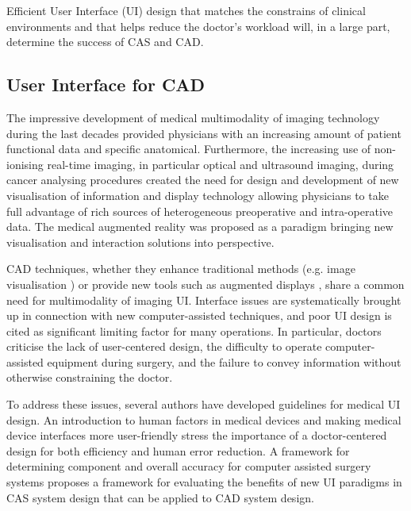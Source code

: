 Efficient User Interface (UI) design that matches the constrains of clinical environments and that helps reduce the doctor's workload will, in a large part, determine the success of CAS and CAD.

\subsection{User Interface for CAD}

The impressive development of medical multimodality of imaging technology during the last decades provided physicians with an increasing amount of patient functional data and specific anatomical. Furthermore, the increasing use of non-ionising real-time imaging, in particular optical and ultrasound imaging, during cancer analysing procedures created the need for design and development of new visualisation of information and display technology \cite{sielhorst2008advanced} allowing physicians to take full advantage of rich sources of heterogeneous preoperative and intra-operative data. The medical augmented reality was proposed as a paradigm bringing new visualisation and interaction solutions into perspective.

\clearpage

CAD techniques, whether they enhance traditional methods (e.g. image visualisation \cite{vogt2003system}) or provide new tools such as augmented displays \cite{sielhorst2008advanced}, share a common need for multimodality of imaging \gls{UI}. Interface issues are systematically brought up in connection with new computer-assisted techniques, and poor UI design is cited \cite{grange2004m, vogt2003system} as significant limiting factor for many operations. In particular, doctors criticise the lack of user-centered design, the difficulty to operate computer-assisted equipment during surgery, and the failure to convey information without otherwise constraining the doctor.

To address these issues, several authors have developed guidelines for medical UI design. An introduction to human factors in medical devices \cite{sawyer1996introduction} and making medical device interfaces more user-friendly \cite{wiklund1998making} stress the importance of a doctor-centered design for both efficiency and human error reduction. A framework for determining component and overall accuracy for computer assisted surgery systems \cite{mor2003framework} proposes a framework for evaluating the benefits of new UI paradigms in CAS system design that can be applied to CAD system design.

